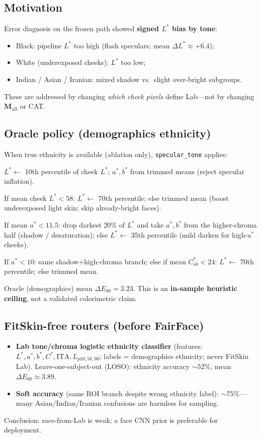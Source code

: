 \documentclass[11pt]{article}
\newcommand{\deee}{\ensuremath{\Delta E_{00}}}
\newcommand{\Maff}{\mathbf{M}_{\mathrm{aff}}}
\begin{document}
\subsection{Motivation}
Error diagnosis on the frozen path showed \textbf{signed $L^*$ bias by tone}:
\begin{itemize}[noitemsep]
  \item Black: pipeline $L^*$ too high (flash speculars; mean $\Delta L^*\approx +6.4$);
  \item White (underexposed cheeks): $L^*$ too low;
  \item Indian / Asian / Iranian: mixed shadow vs.\ slight over-bright subgroups.
\end{itemize}
These are addressed by changing \emph{which cheek pixels} define Lab---not by changing $\Maff$ or CAT.

\subsection{Oracle policy (demographics ethnicity)}
When true ethnicity is available (ablation only), \texttt{specular\_tone} applies:

\begin{description}[style=nextline,leftmargin=1.2em]
  \item[Black]
    $L^* \leftarrow$ 10th percentile of cheek $L^*$; $a^*,b^*$ from trimmed means
    (reject specular inflation).
  \item[White]
    If mean cheek $L^* < 58$: $L^* \leftarrow$ 70th percentile; else trimmed mean
    (boost underexposed light skin; skip already-bright faces).
  \item[Indian]
    If mean $a^* < 11.5$: drop darkest 20\% of $L^*$ and take $a^*,b^*$ from the higher-chroma half
    (shadow / desaturation);
    else $L^* \leftarrow$ 35th percentile (mild darken for high-$a^*$ cheeks).
  \item[Asian / Iranian (medium)]
    If $a^* < 10$: same shadow+high-chroma branch;
    else if mean $C_{ab}^* < 24$: $L^* \leftarrow$ 70th percentile;
    else trimmed mean.
\end{description}

Oracle (demographics) mean $\deee=\num{3.23}$.
This is an \textbf{in-sample heuristic ceiling}, not a validated colorimetric claim.

\subsection{FitSkin-free routers (before FairFace)}
\begin{itemize}[leftmargin=*]
  \item \textbf{Lab tone/chroma logistic ethnicity classifier}
    (features: $L^*,a^*,b^*,C^*,\mathrm{ITA},L_{p10,50,90}$; labels = demographics ethnicity; never FitSkin Lab).
    Leave-one-subject-out (LOSO): ethnicity accuracy ${\sim}52\%$, mean $\deee\approx\num{3.89}$.
  \item \textbf{Soft accuracy} (same ROI branch despite wrong ethnicity label): ${\sim}75\%$---many Asian/Indian/Iranian confusions are harmless for sampling.
\end{itemize}
Conclusion: race-from-Lab is weak; a face CNN prior is preferable for deployment.
\end{document}
